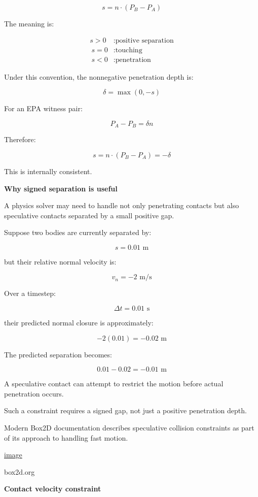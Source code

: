 \[
\boxed{ s=n\cdot(P_B-P_A) }
\]

The meaning is:

\[
\boxed{ \begin{aligned} s>0 &: \text{positive separation}\\\ s=0 &: \text{touching}\\\ s<0 &: \text{penetration} \end{aligned} }
\]

Under this convention, the nonnegative penetration depth is:

\[
\boxed{ \delta=\max(0,-s) }
\]

For an EPA witness pair:

\[
P_A-P_B=\delta n
\]

Therefore:

\[
s=n\cdot(P_B-P_A)=-\delta
\]

This is internally consistent.

\textbf{Why signed separation is useful}

A physics solver may need to handle not only penetrating contacts but also speculative contacts separated by a small positive gap.

Suppose two bodies are currently separated by:

\[
s=0.01\text{ m}
\]

but their relative normal velocity is:

\[
v_n=-2\text{ m/s}
\]

Over a timestep:

\[
\Delta t=0.01\text{ s}
\]

their predicted normal closure is approximately:

\[
-2(0.01)=-0.02\text{ m}
\]

The predicted separation becomes:

\[
0.01-0.02=-0.01\text{ m}
\]

A speculative contact can attempt to restrict the motion before actual penetration occurs.

Such a constraint requires a signed gap, not just a positive penetration depth.

Modern Box2D documentation describes speculative collision constraints as part of its approach to handling fast motion. 

\href{https://www.google.com/s2/favicons?domain=https://box2d.org&sz=32}{image}

box2d.org

\textbf{Contact velocity constraint}

